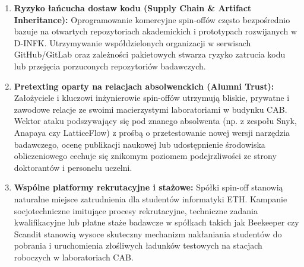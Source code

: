 \begin{enumerate}
    \item \textbf{Ryzyko łańcucha dostaw kodu (Supply Chain \& Artifact Inheritance):} Oprogramowanie komercyjne spin-offów często bezpośrednio bazuje na otwartych repozytoriach akademickich i prototypach rozwijanych w D-INFK. Utrzymywanie współdzielonych organizacji w serwisach GitHub/GitLab oraz zależności pakietowych stwarza ryzyko zatrucia kodu lub przejęcia porzuconych repozytoriów badawczych.
    \item \textbf{Pretexting oparty na relacjach absolwenckich (Alumni Trust):} Założyciele i kluczowi inżynierowie spin-offów utrzymują bliskie, prywatne i zawodowe relacje ze swoimi macierzystymi laboratoriami w budynku CAB. Wektor ataku podszywający się pod znanego absolwenta (np. z zespołu Snyk, Anapaya czy LatticeFlow) z prośbą o przetestowanie nowej wersji narzędzia badawczego, ocenę publikacji naukowej lub udostępnienie środowiska obliczeniowego cechuje się znikomym poziomem podejrzliwości ze strony doktorantów i personelu uczelni.
    \item \textbf{Wspólne platformy rekrutacyjne i stażowe:} Spółki spin-off stanowią naturalne miejsce zatrudnienia dla studentów informatyki ETH. Kampanie socjotechniczne imitujące procesy rekrutacyjne, techniczne zadania kwalifikacyjne lub płatne staże badawcze w spółkach takich jak Beekeeper czy Scandit stanowią wysoce skuteczny mechanizm nakłaniania studentów do pobrania i uruchomienia złośliwych ładunków testowych na stacjach roboczych w laboratoriach CAB.
\end{enumerate}
